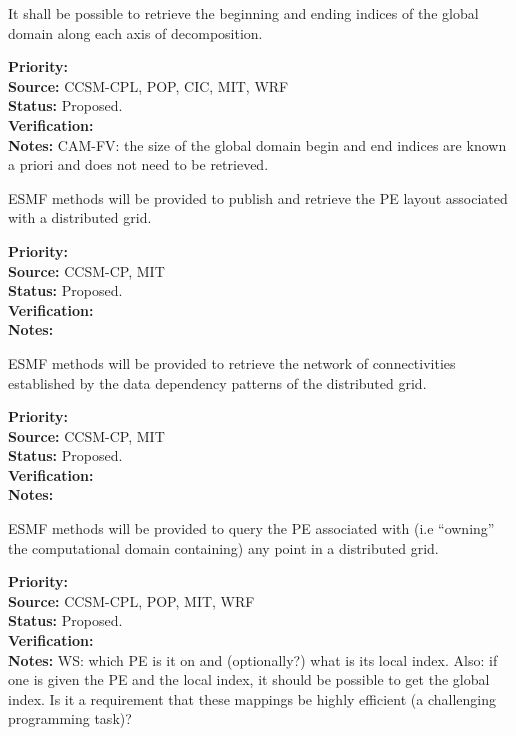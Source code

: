 
It shall be possible to retrieve the beginning and ending indices of the
global domain along each axis of decomposition.

\begin{reqlist}
{\bf Priority:} \\
{\bf Source:} CCSM-CPL, POP, CIC, MIT, WRF \\
{\bf Status:} Proposed. \\
{\bf Verification:} \\
{\bf Notes:} CAM-FV: the size of the global domain begin and end
indices are known a priori and does not need to be retrieved.
\end{reqlist}


ESMF methods will be provided to publish and retrieve the PE layout
associated with a distributed grid.

\begin{reqlist}
{\bf Priority:} \\
{\bf Source:} CCSM-CP, MIT \\
{\bf Status:} Proposed. \\
{\bf Verification:} \\
{\bf Notes:}
\end{reqlist}


ESMF methods will be provided to retrieve the network of
connectivities established by the data dependency patterns of the
distributed grid.

\begin{reqlist}
{\bf Priority:} \\
{\bf Source:} CCSM-CP, MIT \\
{\bf Status:} Proposed. \\
{\bf Verification:} \\
{\bf Notes:}
\end{reqlist}


ESMF methods will be provided to query the PE associated with (i.e
``owning'' the computational domain containing) any point in a
distributed grid.

\begin{reqlist}
{\bf Priority:} \\ 
{\bf Source:} CCSM-CPL, POP, MIT, WRF \\
{\bf Status:} Proposed. \\
{\bf Verification:} \\
{\bf Notes:} WS: which PE is it on and (optionally?) what 
is its local index.  Also: if one is given the PE and the local index, 
it should be possible to get the global index.  Is it a requirement that
these mappings be highly efficient (a challenging programming task)?
\end{reqlist}

